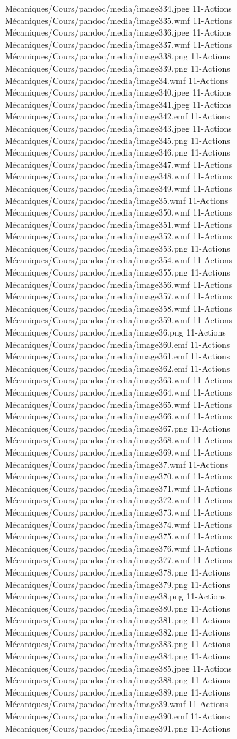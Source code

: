 Mécaniques/Cours/pandoc/media/image334.jpeg 11-Actions Mécaniques/Cours/pandoc/media/image335.wmf 11-Actions Mécaniques/Cours/pandoc/media/image336.jpeg 11-Actions Mécaniques/Cours/pandoc/media/image337.wmf 11-Actions Mécaniques/Cours/pandoc/media/image338.png 11-Actions Mécaniques/Cours/pandoc/media/image339.png 11-Actions Mécaniques/Cours/pandoc/media/image34.wmf 11-Actions Mécaniques/Cours/pandoc/media/image340.jpeg 11-Actions Mécaniques/Cours/pandoc/media/image341.jpeg 11-Actions Mécaniques/Cours/pandoc/media/image342.emf 11-Actions Mécaniques/Cours/pandoc/media/image343.jpeg 11-Actions Mécaniques/Cours/pandoc/media/image345.png 11-Actions Mécaniques/Cours/pandoc/media/image346.png 11-Actions Mécaniques/Cours/pandoc/media/image347.wmf 11-Actions Mécaniques/Cours/pandoc/media/image348.wmf 11-Actions Mécaniques/Cours/pandoc/media/image349.wmf 11-Actions Mécaniques/Cours/pandoc/media/image35.wmf 11-Actions Mécaniques/Cours/pandoc/media/image350.wmf 11-Actions Mécaniques/Cours/pandoc/media/image351.wmf 11-Actions Mécaniques/Cours/pandoc/media/image352.wmf 11-Actions Mécaniques/Cours/pandoc/media/image353.png 11-Actions Mécaniques/Cours/pandoc/media/image354.wmf 11-Actions Mécaniques/Cours/pandoc/media/image355.png 11-Actions Mécaniques/Cours/pandoc/media/image356.wmf 11-Actions Mécaniques/Cours/pandoc/media/image357.wmf 11-Actions Mécaniques/Cours/pandoc/media/image358.wmf 11-Actions Mécaniques/Cours/pandoc/media/image359.wmf 11-Actions Mécaniques/Cours/pandoc/media/image36.png 11-Actions Mécaniques/Cours/pandoc/media/image360.emf 11-Actions Mécaniques/Cours/pandoc/media/image361.emf 11-Actions Mécaniques/Cours/pandoc/media/image362.emf 11-Actions Mécaniques/Cours/pandoc/media/image363.wmf 11-Actions Mécaniques/Cours/pandoc/media/image364.wmf 11-Actions Mécaniques/Cours/pandoc/media/image365.wmf 11-Actions Mécaniques/Cours/pandoc/media/image366.wmf 11-Actions Mécaniques/Cours/pandoc/media/image367.png 11-Actions Mécaniques/Cours/pandoc/media/image368.wmf 11-Actions Mécaniques/Cours/pandoc/media/image369.wmf 11-Actions Mécaniques/Cours/pandoc/media/image37.wmf 11-Actions Mécaniques/Cours/pandoc/media/image370.wmf 11-Actions Mécaniques/Cours/pandoc/media/image371.wmf 11-Actions Mécaniques/Cours/pandoc/media/image372.wmf 11-Actions Mécaniques/Cours/pandoc/media/image373.wmf 11-Actions Mécaniques/Cours/pandoc/media/image374.wmf 11-Actions Mécaniques/Cours/pandoc/media/image375.wmf 11-Actions Mécaniques/Cours/pandoc/media/image376.wmf 11-Actions Mécaniques/Cours/pandoc/media/image377.wmf 11-Actions Mécaniques/Cours/pandoc/media/image378.png 11-Actions Mécaniques/Cours/pandoc/media/image379.png 11-Actions Mécaniques/Cours/pandoc/media/image38.png 11-Actions Mécaniques/Cours/pandoc/media/image380.png 11-Actions Mécaniques/Cours/pandoc/media/image381.png 11-Actions Mécaniques/Cours/pandoc/media/image382.png 11-Actions Mécaniques/Cours/pandoc/media/image383.png 11-Actions Mécaniques/Cours/pandoc/media/image384.png 11-Actions Mécaniques/Cours/pandoc/media/image385.jpeg 11-Actions Mécaniques/Cours/pandoc/media/image388.png 11-Actions Mécaniques/Cours/pandoc/media/image389.png 11-Actions Mécaniques/Cours/pandoc/media/image39.wmf 11-Actions Mécaniques/Cours/pandoc/media/image390.emf 11-Actions Mécaniques/Cours/pandoc/media/image391.png 11-Actions 